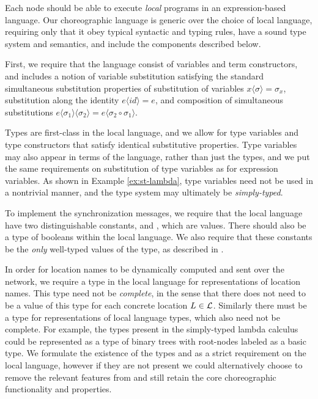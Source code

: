 Each node should be able to execute \emph{local} programs in an expression-based language.
Our choreographic language is generic over the choice of local language, requiring only that it obey typical syntactic and typing rules, have a sound type system and semantics, and include the components described below.

First, we require that the language consist of variables and term constructors, and includes a notion of variable substitution satisfying the standard simultaneous substitution properties of substitution of variables $x \langle \sigma \rangle = \sigma_x$, substitution along the identity $e \langle  id \rangle = e$, and composition of simultaneous substitutions $e \langle \sigma_1 \rangle \langle \sigma_2 \rangle = e \langle \sigma_2 \circ \sigma_1 \rangle$.

Types are first-class in the local language, and we allow for type variables and type constructors that satisfy identical substitutive properties.
Type variables may also appear in terms of the language, rather than just the types, and we put the same requirements on substitution of type variables as for expression variables.
As shown in Example \ref{ex:st-lambda}, type variables need not be used in a nontrivial manner, and the type system may ultimately be \emph{simply-typed}.

To implement the synchronization messages, we require that the local language have two distinguishable constants, \True and \False, which are values.
There should also be a type \Bool of booleans within the local language.
We also require that these constants be the \emph{only} well-typed values of the \Bool type, as described in \todo.

In order for location names to be dynamically computed and sent over the network, we require a type \Loc in the local language for representations of location names.
This type need not be \emph{complete}, in the sense that there does not need to be a value of this type for each concrete location $L \in \mathcal{L}$.
Similarly there must be a type \Typ for representations of local language types, which also need not be complete.
For example, the types present in the simply-typed lambda calculus could be represented as a type of binary trees with root-nodes labeled as a basic type.
We formulate the existence of the types \Loc and \Typ as a strict requirement on the local language, however if they are not present we could alternatively choose to remove the relevant features from \langname and still retain the core choreographic functionality and properties.

